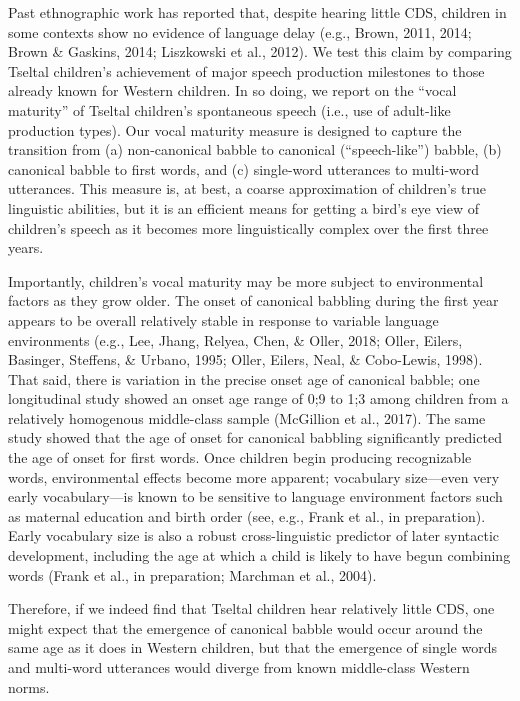 \documentclass[floatsintext,man]{apa6}
\theoremstyle{definition}
\theoremstyle{definition}
\theoremstyle{definition}
\theoremstyle{remark}
\begin{document}
Past ethnographic work has reported that, despite hearing little CDS,
children in some contexts show no evidence of language delay (e.g.,
Brown, 2011, 2014; Brown \& Gaskins, 2014; Liszkowski et al., 2012). We
test this claim by comparing Tseltal children's achievement of major
speech production milestones to those already known for Western
children. In so doing, we report on the \enquote{vocal maturity} of
Tseltal children's spontaneous speech (i.e., use of adult-like
production types). Our vocal maturity measure is designed to capture the
transition from (a) non-canonical babble to canonical
(\enquote{speech-like}) babble, (b) canonical babble to first words, and
(c) single-word utterances to multi-word utterances. This measure is, at
best, a coarse approximation of children's true linguistic abilities,
but it is an efficient means for getting a bird's eye view of children's
speech as it becomes more linguistically complex over the first three
years.

Importantly, children's vocal maturity may be more subject to
environmental factors as they grow older. The onset of canonical
babbling during the first year appears to be overall relatively stable
in response to variable language environments (e.g., Lee, Jhang, Relyea,
Chen, \& Oller, 2018; Oller, Eilers, Basinger, Steffens, \& Urbano,
1995; Oller, Eilers, Neal, \& Cobo-Lewis, 1998). That said, there is
variation in the precise onset age of canonical babble; one longitudinal
study showed an onset age range of 0;9 to 1;3 among children from a
relatively homogenous middle-class sample (McGillion et al., 2017). The
same study showed that the age of onset for canonical babbling
significantly predicted the age of onset for first words. Once children
begin producing recognizable words, environmental effects become more
apparent; vocabulary size---even very early vocabulary---is known to be
sensitive to language environment factors such as maternal education and
birth order (see, e.g., Frank et al., in preparation). Early vocabulary
size is also a robust cross-linguistic predictor of later syntactic
development, including the age at which a child is likely to have begun
combining words (Frank et al., in preparation; Marchman et al., 2004).

Therefore, if we indeed find that Tseltal children hear relatively
little CDS, one might expect that the emergence of canonical babble
would occur around the same age as it does in Western children, but that
the emergence of single words and multi-word utterances would diverge
from known middle-class Western norms.
\end{document}
